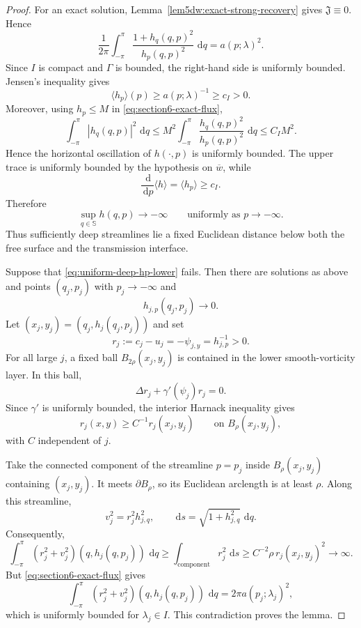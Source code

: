 \documentclass[11pt,reqno]{amsart}
\numberwithin{equation}{section}
\newcommand{\dd}{\,\mathrm{d}}
\theoremstyle{definition}
\theoremstyle{remark}
\begin{document}
\begin{proof}
For an exact solution, Lemma~\ref{lem5dw:exact-strong-recovery}
gives $\mathfrak J\equiv0$.  Hence
\begin{equation}\label{eq:section6-exact-flux}
 \frac1{2\pi}\int_{-\pi}^{\pi}
 \frac{1+h_q(q,p)^2}{h_p(q,p)^2}\,\dd q
 =a(p;\lambda)^2.
\end{equation}
Since $I$ is compact and $\Gamma$ is bounded, the right-hand side is
uniformly bounded.  Jensen's inequality gives
\[
 \langle h_p\rangle(p)\ge a(p;\lambda)^{-1}\ge c_I>0.
\]
Moreover, using $h_p\le M$ in \eqref{eq:section6-exact-flux},
\[
 \int_{-\pi}^{\pi}|h_q(q,p)|^2\,\dd q
 \le M^2\int_{-\pi}^{\pi}
 \frac{h_q(q,p)^2}{h_p(q,p)^2}\,\dd q
 \le C_I M^2.
\]
Hence the horizontal oscillation of $h(\cdot,p)$ is uniformly
bounded.  The upper trace is uniformly bounded by the hypothesis on
$\overline w$, while
\[
 \frac{\dd}{\dd p}\langle h\rangle=\langle h_p\rangle\ge c_I.
\]
Therefore
\[
 \sup_{q\in\mathbb S}h(q,p)\longrightarrow-\infty
 \qquad\text{uniformly as }p\to-\infty.
\]
Thus sufficiently deep streamlines lie a fixed Euclidean distance
below both the free surface and the transmission interface.

Suppose that \eqref{eq:uniform-deep-hp-lower} fails.  Then there are
solutions as above and points $(q_j,p_j)$ with $p_j\to-\infty$ and
\[
 h_{j,p}(q_j,p_j)\longrightarrow0.
\]
Let $(x_j,y_j)=(q_j,h_j(q_j,p_j))$ and set
\[
 r_j:=c_j-u_j=-\psi_{j,y}=h_{j,p}^{-1}>0.
\]
For all large $j$, a fixed ball $B_{2\rho}(x_j,y_j)$ is contained in
the lower smooth-vorticity layer.  In this ball,
\[
 \Delta r_j+\gamma'(\psi_j)r_j=0.
\]
Since $\gamma'$ is uniformly bounded, the interior Harnack inequality
gives
\[
 r_j(x,y)\ge C^{-1}r_j(x_j,y_j)
 \qquad\text{on }B_\rho(x_j,y_j),
\]
with $C$ independent of $j$.

Take the connected component of the streamline $p=p_j$ inside
$B_\rho(x_j,y_j)$ containing $(x_j,y_j)$.  It meets
$\partial B_\rho$, so its Euclidean arclength is at least $\rho$.
Along this streamline,
\[
 v_j^2=r_j^2h_{j,q}^2,\qquad
 \dd s=\sqrt{1+h_{j,q}^2}\,\dd q.
\]
Consequently,
\[
 \int_{-\pi}^{\pi}(r_j^2+v_j^2)
       (q,h_j(q,p_j))\,\dd q
 \ge
 \int_{\text{component}}r_j^2\,\dd s
 \ge C^{-2}\rho\,r_j(x_j,y_j)^2
 \longrightarrow\infty.
\]
But \eqref{eq:section6-exact-flux} gives
\[
 \int_{-\pi}^{\pi}(r_j^2+v_j^2)
       (q,h_j(q,p_j))\,\dd q
 =2\pi a(p_j;\lambda_j)^2,
\]
which is uniformly bounded for $\lambda_j\in I$.  This contradiction
proves the lemma.
\end{proof}
\end{document}

